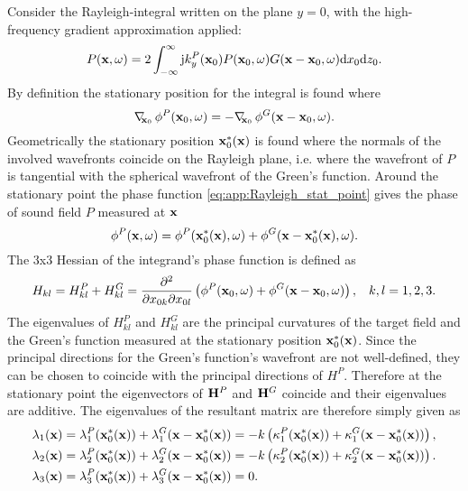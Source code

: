 Consider the Rayleigh-integral written on the plane $y = 0$, with the high-frequency gradient approximation applied:
\begin{equation}
P(\mathbf{x},\omega) = 2 \int_{-\infty}^{\infty} \mathrm{j} k_y^P(\mathbf{x}_0) P(\mathbf{x}_0, \omega) G(\mathbf{x}-\mathbf{x}_0,\omega) \mathrm{d} x_0  \mathrm{d} z_0.
\end{equation}
By definition the stationary position for the integral is found where
\begin{equation}
\label{eq:app:Rayleigh_stat_point}
\Dxo \phi^P(\vxo,\omega) = -\Dxo \phi^G(\vx-\vxo,\omega).  %
\end{equation}
Geometrically the stationary position $\mathbf{x}_0^*(\mathbf{x})$ is found where the normals of the involved wavefronts coincide on the Rayleigh plane, i.e. where the wavefront of $P$ is tangential with the spherical wavefront of the Green's function.
Around the stationary point the phase function \eqref{eq:app:Rayleigh_stat_point} gives the phase of sound field $P$ measured at $\mathbf{x}$
\begin{equation}
\phi^P(\vx,\omega) = \phi^P(\vxo^*(\vx),\omega) + \phi^G(\vx-\vxo^*(\vx),\omega).  %
\end{equation}
The 3x3 Hessian of the integrand's phase function is defined as
\begin{equation}
\label{eq:app:Hessian_for_Rayleigh}
H_{kl} = H_{kl}^P+ H_{kl}^G = \frac{\partial^2}{\partial x_{0 k} \partial x_{0 l}}\left( \phi^P(\mathbf{x}_0,\omega) + \phi^G(\mathbf{x}-\mathbf{x}_0,\omega) \right), \hspace{3mm} k,l = 1,2,3.
\end{equation}
The eigenvalues of $H_{kl}^P$ and $H_{kl}^G$ are the principal curvatures of the target field and the Green's function measured at the stationary position $\mathbf{x}_0^*(\mathbf{x})$.
Since the principal directions for the Green's function's wavefront are not well-defined, they can be chosen to coincide with the principal directions of $H^P$.
Therefore at the stationary point the eigenvectors of $\mathbf{H}^P$ and $\mathbf{H}^G$ coincide and their eigenvalues are additive.
The eigenvalues of the resultant matrix are therefore simply given as
\begin{align}
\label{eq:app:propagated_curvature}
\lambda_1(\mathbf{x}) &= \lambda_1^P(\mathbf{x}_0^*(\mathbf{x})) + \lambda_1^G(\mathbf{x}-\mathbf{x}_0^*(\mathbf{x})) = -k \left( \kappa_1^P(\mathbf{x}_0^*(\mathbf{x})) + \kappa_1^G(\mathbf{x}-\mathbf{x}_0^*(\mathbf{x})) \right), \\
\lambda_2(\mathbf{x}) &= \lambda_2^P(\mathbf{x}_0^*(\mathbf{x})) + \lambda_2^G(\mathbf{x}-\mathbf{x}_0^*(\mathbf{x})) = -k \left( \kappa_2^P(\mathbf{x}_0^*(\mathbf{x})) + \kappa_2^G(\mathbf{x}-\mathbf{x}_0^*(\mathbf{x})) \right). \\
\lambda_3(\mathbf{x}) &= \lambda_3^P(\mathbf{x}_0^*(\mathbf{x})) + \lambda_3^G(\mathbf{x}-\mathbf{x}_0^*(\mathbf{x})) = 0.
\end{align}
\vspace{0.5mm}

